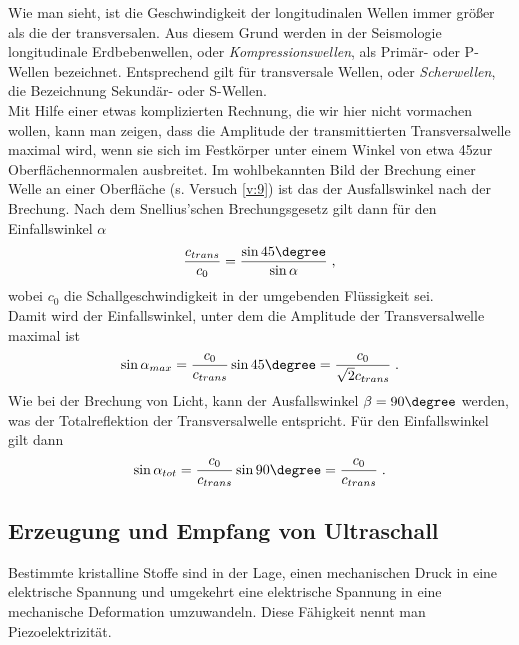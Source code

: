 Wie man sieht, ist die Geschwindigkeit der longitudinalen Wellen immer größer als die der transversalen. Aus diesem Grund werden in der Seismologie longitudinale Erdbebenwellen, oder \textit{Kompressionswellen}, als Primär- oder P-Wellen bezeichnet. Entsprechend gilt für transversale Wellen, oder \textit{Scherwellen}, die Bezeichnung Sekundär- oder S-Wellen.\\

\noindent
Mit Hilfe einer etwas komplizierten Rechnung, die wir hier nicht vormachen wollen, kann man zeigen, dass die Amplitude der transmittierten Transversalwelle maximal wird, wenn sie sich im Festkörper unter einem Winkel von etwa 45\degree zur Oberflächennormalen ausbreitet. Im wohlbekannten Bild der Brechung einer Welle an einer Oberfläche (s. Versuch \ref{v:9}) ist das der Ausfallswinkel nach der Brechung. Nach dem Snellius'schen Brechungsgesetz gilt dann für den Einfallswinkel $\alpha$
\begin{equation}
	\frac{c_{trans}}{c_0} = \frac{\sin 45\degree}{\sin \alpha}\; ,
\end{equation}
wobei $c_0$ die Schallgeschwindigkeit in der umgebenden Flüssigkeit sei.\\
Damit wird der Einfallswinkel, unter dem die Amplitude der Transversalwelle maximal ist
\begin{equation}
	\sin \alpha_{max} = \frac{c_0}{c_{trans}} \sin 45\degree = \frac{c_0}{\sqrt{2}c_{trans}}\; .
\end{equation}
Wie bei der Brechung von Licht, kann der Ausfallswinkel $\beta = 90\degree$ werden, was der Totalreflektion der Transversalwelle entspricht. Für den Einfallswinkel gilt dann
\begin{equation}
	\sin \alpha_{tot} = \frac{c_0}{c_{trans}} \sin 90\degree = \frac{c_0}{c_{trans}}\; .
\end{equation}

\subsection{Erzeugung und Empfang von Ultraschall}

Bestimmte kristalline Stoffe sind in der Lage, einen mechanischen Druck in eine elektrische Spannung und umgekehrt eine elektrische Spannung in eine mechanische Deformation umzuwandeln. Diese Fähigkeit nennt man Piezoelektrizität.\\

